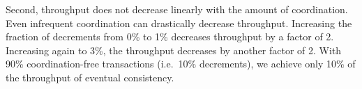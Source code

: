 \begin{benchmark}
  Second, throughput does not decrease linearly with the amount of
  coordination. Even infrequent coordination can drastically decrease
  throughput. Increasing the fraction of decrements from 0\% to 1\% decreases
  throughput by a factor of 2. Increasing again to 3\%, the throughput
  decreases by another factor of 2. With 90\% coordination-free transactions
  (i.e.\ 10\% decrements), we achieve only 10\% of the throughput of eventual
  consistency.

\end{benchmark}

%

